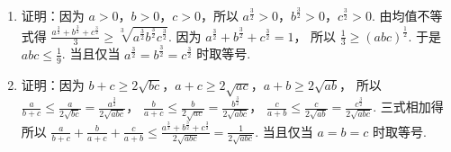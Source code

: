 \begin{solution}
\begin{enumerate}
\item 证明：因为 \(a>0\)，\(b>0\)，\(c>0\)，所以 \(a^{\frac{3}{2}}>0\)，\(b^{\frac{3}{2}}>0\)，\(c^{\frac{3}{2}}>0\).
由均值不等式得 \(\frac{a^{\frac{3}{2}}+b^{\frac{3}{2}}+c^{\frac{3}{2}}}{3}\ge \sqrt[3]{a^{\frac{3}{2}}b^{\frac{3}{2}}c^{\frac{3}{2}}}\).
因为
\(a^{\frac{3}{2}}+b^{\frac{3}{2}}+c^{\frac{3}{2}}=1\)，
所以
\(\frac{1}{3}\ge (abc)^{\frac{1}{2}}\).
于是
\(abc\le \frac{1}{9}\).
当且仅当
\(a^{\frac{3}{2}}=b^{\frac{3}{2}}=c^{\frac{3}{2}}\)
时取等号.

\item 证明：因为
\(b+c\ge 2\sqrt{bc}\)，\(a+c\ge 2\sqrt{ac}\)，\(a+b\ge 2\sqrt{ab}\)，
所以
\(\frac{a}{b+c}\le \frac{a}{2\sqrt{bc}}=\frac{a^{\frac{3}{2}}}{2\sqrt{abc}}\)，
\(\frac{b}{a+c}\le \frac{b}{2\sqrt{ac}}=\frac{b^{\frac{3}{2}}}{2\sqrt{abc}}\)，
\(\frac{c}{a+b}\le \frac{c}{2\sqrt{ab}}=\frac{c^{\frac{3}{2}}}{2\sqrt{abc}}\).
三式相加得
所以 \(\frac{a}{b+c}+\frac{b}{a+c}+\frac{c}{a+b}\le \frac{a^{\frac{3}{2}}+b^{\frac{3}{2}}+c^{\frac{3}{2}}}{2\sqrt{abc}}=\frac{1}{2\sqrt{abc}}\).
当且仅当 \(a=b=c\) 时取等号.
\end{enumerate}
\end{solution}

